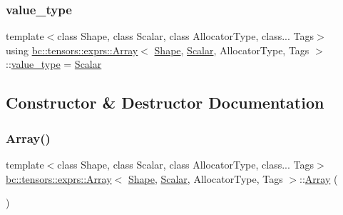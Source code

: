 \subsubsection{\texorpdfstring{value\+\_\+type}{value\_type}}
{\footnotesize\ttfamily template$<$class Shape, class Scalar, class Allocator\+Type, class... Tags$>$ \\
using \hyperlink{structbc_1_1tensors_1_1exprs_1_1Array}{bc\+::tensors\+::exprs\+::\+Array}$<$ \hyperlink{structbc_1_1Shape}{Shape}, \hyperlink{namespacebc_aa12ac55ee2c43dc082894dd3859daee1}{Scalar}, Allocator\+Type, Tags $>$\+::\hyperlink{structbc_1_1Shape_a52aafd6585a5eae8a3b82f650d3afc1c}{value\+\_\+type} =  \hyperlink{namespacebc_aa12ac55ee2c43dc082894dd3859daee1}{Scalar}}



\subsection{Constructor \& Destructor Documentation}
\mbox{\label{structbc_1_1tensors_1_1exprs_1_1Array_aee4d34e0da545cb3463a2359a2daf6d4}} 
\subsubsection{\texorpdfstring{Array()}{Array()}\hspace{0.1cm}{\footnotesize\ttfamily [1/9]}}
{\footnotesize\ttfamily template$<$class Shape, class Scalar, class Allocator\+Type, class... Tags$>$ \\
\hyperlink{structbc_1_1tensors_1_1exprs_1_1Array}{bc\+::tensors\+::exprs\+::\+Array}$<$ \hyperlink{structbc_1_1Shape}{Shape}, \hyperlink{namespacebc_aa12ac55ee2c43dc082894dd3859daee1}{Scalar}, Allocator\+Type, Tags $>$\+::\hyperlink{structbc_1_1tensors_1_1exprs_1_1Array}{Array} (\begin{DoxyParamCaption}{ }\end{DoxyParamCaption})\hspace{0.3cm}{\ttfamily [inline]}}

\mbox{\label{structbc_1_1tensors_1_1exprs_1_1Array_a404b48bf95a86c8cb6978a3bf0107ffe}} 
